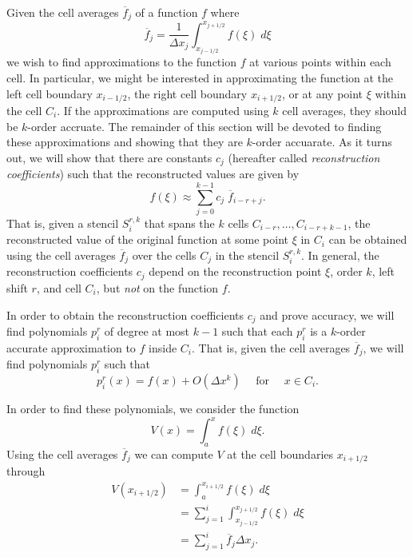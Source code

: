 \documentclass{article}
\newcommand{\for}[0]{\quad \text{ for } \quad}
\newcommand{\xli}[0]{x_{i-1/2}}
\newcommand{\xri}[0]{x_{i+1/2}}
\newcommand{\xlj}[0]{x_{j-1/2}}
\newcommand{\xrj}[0]{x_{j+1/2}}
\numberwithin{equation}{section}
\begin{document}
Given the cell averages $\overline{f}_j$ of a function $f$ where
\begin{equation}
  \overline{f}_j = \frac{1}{\Delta x_j} \int_{\xlj}^{\xrj} f(\xi) \;d\xi
\end{equation}
we wish to find approximations to the function $f$ at various points
within each cell.  In particular, we might be interested in
approximating the function at the left cell boundary $\xli$, the right
cell boundary $\xri$, or at any point $\xi$ within the cell $C_i$.  If
the approximations are computed using $k$ cell averages, they should
be $k$-order accruate.  The remainder of this section will be devoted
to finding these approximations and showing that they are $k$-order
accuarate.  As it turns out, we will show that there are constants
$c_j$ (hereafter called \emph{reconstruction coefficients}) such that
the reconstructed values are given by
\begin{equation*}
  f(\xi) \approx \sum_{j=0}^{k-1} c_j\; \overline{f}_{i-r+j}.
\end{equation*}
That is, given a stencil $S_i^{r,k}$ that spans the $k$ cells
$C_{i-r},\ldots,C_{i-r+k-1}$, the reconstructed value of the original
function at some point $\xi$ in $C_i$ can be obtained using the cell
averages $\overline{f}_{j}$ over the cells $C_j$ in the stencil
$S_i^{r,k}$.  In general, the reconstruction coefficients $c_j$ depend
on the reconstruction point $\xi$, order $k$, left shift $r$, and cell
$C_i$, but \emph{not} on the function $f$.

In order to obtain the reconstruction coefficients $c_j$ and prove
accuracy, we will find polynomials $p^r_i$ of degree at most $k-1$
such that each $p^r_i$ is a $k$-order accurate approximation to $f$
inside $C_i$.  That is, given the cell averages $\overline{f}_j$, we
will find polynomials $p^r_i$ such that
\begin{equation*}
  p^r_i(x) = f(x) + O(\Delta x^k) \for x \in C_i.
\end{equation*}

In order to find these polynomials, we consider the function
\begin{equation}
  \label{eq:V}
  V(x) = \int_a^x f(\xi) \;d\xi.
\end{equation}
Using the cell averages $\overline{f}_j$ we can compute $V$ at the
cell boundaries $\xri$ through
\begin{align}
  V(\xri) &= \int_a^{\xri} f(\xi) \;d\xi \nonumber \\
          &= \sum_{j=1}^i \int_{\xlj}^{\xrj} f(\xi) \;d\xi \nonumber \\
          &= \sum_{j=1}^i \overline{f}_j \Delta x_j.
          \label{eq:Vsum}
\end{align}
\end{document}
